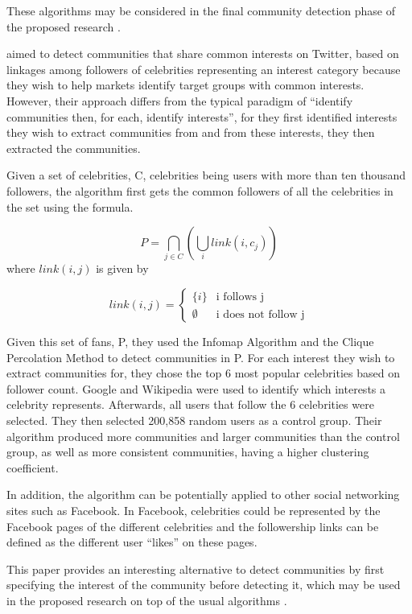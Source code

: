 These algorithms may be considered in the final community detection phase of the proposed research \cite{Tang:2010}.

 aimed to detect communities that share common interests on Twitter, based on linkages among followers of celebrities representing an interest category because they wish to help markets identify target groups with common interests. However, their approach differs from the typical  paradigm of ``identify communities then, for each, identify interests'', for they first identified interests they wish to extract communities from and from these interests, they then extracted the communities. 

Given a set of celebrities, C, celebrities being users with more than ten thousand followers, the algorithm first gets the common followers of all the celebrities in the set using the formula. 

\begin{equation}
	P = \bigcap_{j \in C} (\bigcup_i link(i,c_j))
\end{equation}where $link(i,j)$ is given by

\begin{equation}
	link(i,j) = \begin{cases}
		\{i\} & \text{i follows j} \\
		\emptyset & \text{i does not follow j}
	\end{cases}
\end{equation}

Given this set of fans, P, they used the Infomap Algorithm and the Clique Percolation Method to detect communities in P. For each interest they wish to extract communities for, they chose the top 6 most popular celebrities based on follower count. Google and Wikipedia were used to identify which interests a celebrity represents. Afterwards, all users that follow the 6 celebrities were selected. They then selected 200,858 random users as a control group. Their algorithm produced more communities and larger communities than the control group, as well as more consistent communities, having a higher clustering coefficient. 

In addition, the algorithm can be potentially applied to other social networking sites such as Facebook. In Facebook, celebrities could be represented by the Facebook pages of the different celebrities and the followership links can be defined as the different user ``likes'' on these pages.

This paper provides an interesting alternative to detect communities by first specifying the interest of the community before detecting it, which may be used in the proposed research on top of the usual algorithms \cite{Lim:2012:1}.

